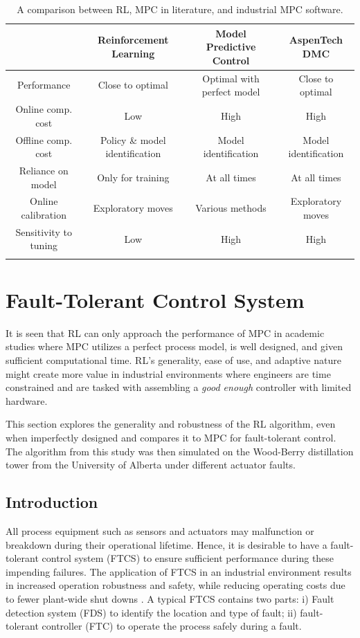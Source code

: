 \begin{table}[H]
\caption{A comparison between RL, MPC in literature, and industrial MPC software.}
\centering
{\scriptsize
\begin{tabular}{c|c|c|c}
& \textbf{Reinforcement Learning}	& \textbf{Model Predictive Control} & \textbf{AspenTech DMC}\\
\hline
Performance             & Close to optimal			& Optimal with perfect model   &  Close to optimal \\
Online comp. cost		& Low			& High   &  High \\
Offline comp. cost		& Policy \& model identification			& Model identification   &  Model identification \\
Reliance on model         	& Only for training			& At all times   &  At all times \\
Online calibration		& Exploratory moves			&  Various methods   &  Exploratory moves \\
Sensitivity to tuning   & Low			& High   &  High \\
\label{tab:rl_mpc_dmc}
\end{tabular}}
\end{table}

%
%
% 
%  
% 
% 
% 

\section{Fault-Tolerant Control System}
It is seen that RL can only approach the performance of MPC in academic studies where MPC utilizes a perfect process model, is well designed, and given sufficient computational time.  RL's generality, ease of use, and adaptive nature might create more value in industrial environments where engineers are time constrained and are tasked with assembling a \textit{good enough} controller with limited hardware.

This section explores the generality and robustness of the RL algorithm, even when imperfectly designed and compares it to MPC for fault-tolerant control.  The algorithm from this study was then simulated on the Wood-Berry distillation tower from the University of Alberta under different actuator faults.

\subsection{Introduction}
All process equipment such as sensors and actuators may malfunction or breakdown during their operational lifetime. Hence, it is desirable to have a fault-tolerant control system (FTCS) to ensure sufficient performance during these impending failures. The application of FTCS in an industrial environment results in increased operation robustness and safety, while reducing operating costs due to fewer plant-wide shut downs \cite{ftc_book_ref1}. A typical FTCS contains two parts: i) Fault detection system (FDS) to identify the location and type of fault; ii) fault-tolerant controller (FTC) to operate the process safely during a fault.


